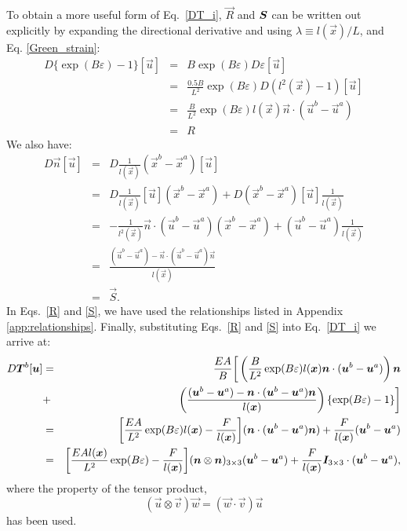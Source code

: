 To obtain a more useful form of Eq.\ \eqref{DT_i}, $\vec{R}$ and $\bm{S}$ can be written out explicitly by expanding the directional derivative and using $\lambda \equiv l(\vec{x})/L$, and Eq. \eqref{Green_strain}: 
%
\begin{eqnarray}
D \{ \exp(B \varepsilon) - 1\} [\vec{u}] &=& B \exp(B \varepsilon) D \varepsilon [\vec{u}] \nonumber\\
&=& \frac{0.5B}{L^2} \exp(B \varepsilon) D( l^2(\vec{x}) - 1) [\vec{u}]\nonumber\\
&=& \frac{B}{L^2}\exp(B \varepsilon)   l(\vec{x})\vec{n} \cdot (\vec{u}^b - \vec{u}^a) \nonumber\\
&=& R
\label{R}
\end{eqnarray}
%
We also have:
%
\begin{eqnarray}
D \vec{n} [\vec{u}]  &=& D \frac{1}{l(\vec{x})}(\vec{x}^b - \vec{x}^a) [\vec{u}] \nonumber\\
&=& D \frac{1}{l(\vec{x})} [\vec{u}](\vec{x}^b - \vec{x}^a) + D (\vec{x}^b - \vec{x}^a) [\vec{u}] \frac{1}{l(\vec{x})} \nonumber\\
&=& -\frac{1}{l^{2}(\vec{x})}\vec{n} \cdot (\vec{u}^b - \vec{u}^a)(\vec{x}^b - \vec{x}^a) + (\vec{u}^b - \vec{u}^a)  \frac{1}{l(\vec{x})} \nonumber\\
&=& \frac{(\vec{u}^b - \vec{u}^a)-\vec{n} \cdot (\vec{u}^b - \vec{u}^a)\vec{n}}{l(\vec{x})} \nonumber\\
&=& \vec{S}.
\label{S}
\end{eqnarray}
%
In Eqs.\ \eqref{R} and \eqref{S}, we have used the relationships listed in Appendix \ref{app:relationships}. Finally, substituting Eqs.\ \eqref{R} and \eqref{S} into Eq.\ \eqref{DT_i} we arrive at:
%
\begin{eqnarray}
D\bm{T}^b [\bm{u}] &=& \frac{E A}{B} \bigg[ \left(\frac{B }{L^2} \exp(B \varepsilon) l(\bm{x})\bm{n} \cdot (\bm{u}^b - \bm{u}^a)\right)\bm{n} \nonumber\\
&+& \left( \frac{(\bm{u}^b - \bm{u}^a)-\bm{n} \cdot (\bm{u}^b - \bm{u}^a)\bm{n}}{l(\bm{x})} \right) \{ \exp(B \varepsilon) - 1 \} \bigg] \nonumber\\
&=& \bigg[ \frac{E A }{L^2} \exp(B \varepsilon)  l(\bm{x})-\frac{F}{l(\bm{x})} \bigg] (\bm{n} \cdot (\bm{u}^b - \bm{u}^a)\bm{n}) + \frac{F}{l(\bm{x})}(\bm{u}^b - \bm{u}^a) \nonumber\\
&=& \bigg[ \frac{E A  l(\bm{x})}{L^2} \exp(B \varepsilon) -\frac{F}{l(\bm{x})} \bigg] (\bm{n} \otimes \bm{n})_{3\times3}(\bm{u}^b - \bm{u}^a) + \frac{F}{l(\bm{x})} \bm{I}_{3\times3} \cdot (\bm{u}^b - \bm{u}^a) , \nonumber\\
\label{DTi_final}
\end{eqnarray}
%
where the property of the tensor product,
%
\begin{equation}
(\vec{u} \otimes \vec{v})\vec{w} = (\vec{w} \cdot \vec{v})\vec{u}
\end{equation}
%
has been used.

